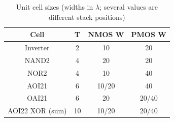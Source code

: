 \documentclass[conference,a4paper]{IEEEtran}
\begin{document}
\begin{table}[H]\centering\footnotesize
\caption{Unit cell sizes (widths in $\lambda$; several values are different stack positions)}
\label{tab:gatesize}
\begin{tabular}{|c|c|c|c|}\hline
Cell & T & NMOS W & PMOS W \\ \hline
Inverter & 2 & 10 & 20 \\ \hline
NAND2 & 4 & 20 & 20 \\ \hline
NOR2 & 4 & 10 & 40 \\ \hline
AOI21 & 6 & 10/20 & 40 \\ \hline
OAI21 & 6 & 20 & 20/40 \\ \hline
AOI22 XOR (sum) & 10 & 10/20 & 20/40 \\ \hline
\end{tabular}
\end{table}
\end{document}
